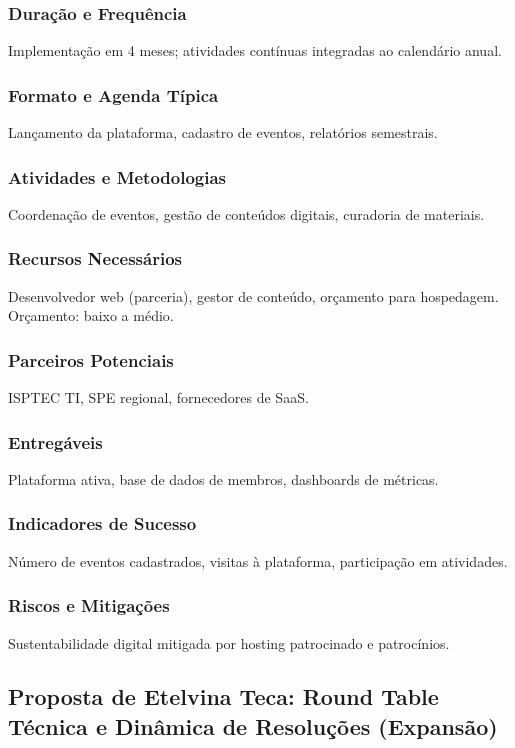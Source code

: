 \documentclass[12pt,a4paper]{article}
\begin{document}
\subsubsection*{Duração e Frequência}
Implementação em 4 meses; atividades contínuas integradas ao calendário anual.

\subsubsection*{Formato e Agenda Típica}
Lançamento da plataforma, cadastro de eventos, relatórios semestrais.

\subsubsection*{Atividades e Metodologias}
Coordenação de eventos, gestão de conteúdos digitais, curadoria de materiais.

\subsubsection*{Recursos Necessários}
Desenvolvedor web (parceria), gestor de conteúdo, orçamento para hospedagem. Orçamento: baixo a médio.

\subsubsection*{Parceiros Potenciais}
ISPTEC TI, SPE regional, fornecedores de SaaS.

\subsubsection*{Entregáveis}
Plataforma ativa, base de dados de membros, dashboards de métricas.

\subsubsection*{Indicadores de Sucesso}
Número de eventos cadastrados, visitas à plataforma, participação em atividades.

\subsubsection*{Riscos e Mitigações}
Sustentabilidade digital mitigada por hosting patrocinado e patrocínios.

\subsection{Proposta de Etelvina Teca: Round Table Técnica e Dinâmica de Resoluções (Expansão)}
\end{document}
